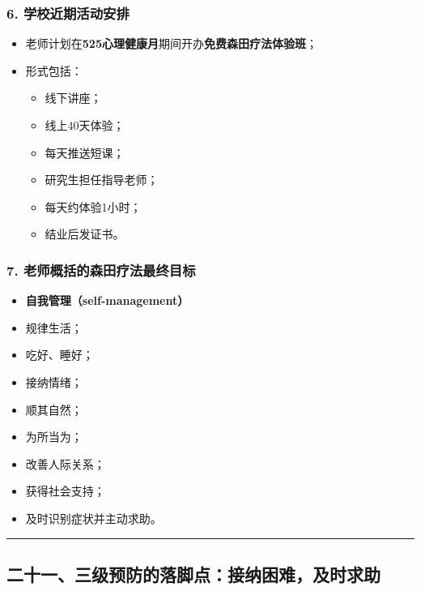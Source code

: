 \documentclass[
  chinese,
  9pt,
  a4paper,
]{ctexart}
\providecommand{\tightlist}{%
  \setlength{\itemsep}{0pt}\setlength{\parskip}{0pt}}
\begin{document}
\subsubsection{6.
学校近期活动安排}\label{ux5b66ux6821ux8fd1ux671fux6d3bux52a8ux5b89ux6392}

\begin{itemize}
\item
  老师计划在\textbf{525心理健康月}期间开办\textbf{免费森田疗法体验班}；
\item
  形式包括：

  \begin{itemize}
  \tightlist
  \item
    线下讲座；
  \item
    线上40天体验；
  \item
    每天推送短课；
  \item
    研究生担任指导老师；
  \item
    每天约体验1小时；
  \item
    结业后发证书。
  \end{itemize}
\end{itemize}

\subsubsection{7.
老师概括的森田疗法最终目标}\label{ux8001ux5e08ux6982ux62ecux7684ux68eeux7530ux7597ux6cd5ux6700ux7ec8ux76eeux6807}

\begin{itemize}
\tightlist
\item
  \textbf{自我管理（self-management）}
\item
  规律生活；
\item
  吃好、睡好；
\item
  接纳情绪；
\item
  顺其自然；
\item
  为所当为；
\item
  改善人际关系；
\item
  获得社会支持；
\item
  及时识别症状并主动求助。
\end{itemize}

\begin{center}\rule{0.5\linewidth}{0.5pt}\end{center}

\subsection{二十一、三级预防的落脚点：接纳困难，及时求助}\label{ux4e8cux5341ux4e00ux4e09ux7ea7ux9884ux9632ux7684ux843dux811aux70b9ux63a5ux7eb3ux56f0ux96beux53caux65f6ux6c42ux52a9}
\end{document}
